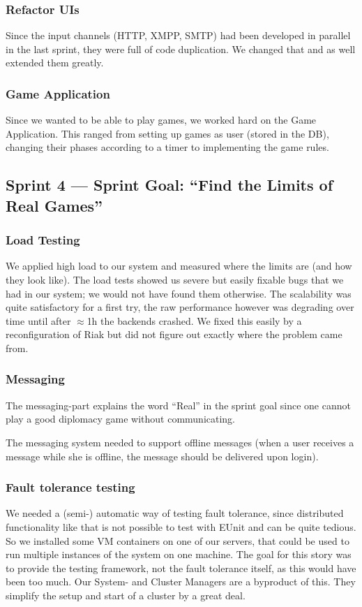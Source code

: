 \documentclass[11pt,a4paper]{report}
\begin{document}
\subsubsection{Refactor UIs}
Since the input channels (HTTP, XMPP, SMTP) had been developed in parallel in
the last sprint, they were full of code duplication. We changed that and as well
extended them greatly.
\subsubsection{Game Application}
Since we wanted to be able to play games, we worked hard on the Game
Application. This ranged from setting up games as user (stored in the DB),
changing their phases according to a timer to implementing the game rules.

\subsection*{Sprint 4 --- Sprint Goal: ``Find the Limits of Real Games''}
\subsubsection{Load Testing}
We applied high load to our system and measured where the limits are (and how
they look like). The load tests showed us severe but easily fixable bugs that we
had in our system; we would not have found them otherwise. The scalability was
quite satisfactory for a first try, the raw performance however was degrading
over time until after $\approx$1h the backends crashed. We fixed this easily by
a reconfiguration of Riak but did not figure out exactly where the problem came
from.
\subsubsection{Messaging}
The messaging-part explains the word ``Real'' in the sprint goal since one
cannot play a good diplomacy game without communicating.

The messaging system needed to support offline messages (when a user receives a
message while she is offline, the message should be delivered upon login).
\subsubsection{Fault tolerance testing}
We needed a (semi-) automatic way of testing fault tolerance, since distributed
functionality like that is not possible to test with EUnit and can be quite
tedious. So we installed some VM containers on one of our servers, that could be
used to run multiple instances of the system on one machine. The goal for this
story was to provide the testing framework, not the fault tolerance itself, as
this would have been too much. Our System- and Cluster Managers are a byproduct
of this. They simplify the setup and start of a cluster by a great deal.
\end{document}
